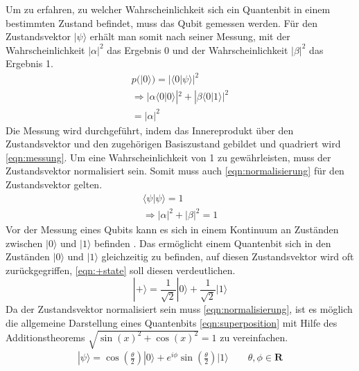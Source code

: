 Um zu erfahren, zu welcher Wahrscheinlichkeit sich ein Quantenbit in einem bestimmten Zustand befindet, muss das Qubit gemessen werden. F\"ur den Zustandsvektor $|\psi\rangle$ erh\"alt man somit nach seiner Messung, mit der Wahrscheinlichkeit $|\alpha|^2$ das Ergebnis 0 und der Wahrscheinlichkeit $|\beta|^2$ das Ergebnis 1.
\begin{equation}\label{eqn:messung}
        \begin{gathered}
                p(|0\rangle) = |\langle 0|\psi \rangle|^2 \\
                \Rightarrow | \alpha \langle 0|0 \rangle|^2 + |\beta \langle 0|1 \rangle |^2 \\
                = | \alpha |^2
        \end{gathered}       
\end{equation}
Die Messung wird durchgef\"uhrt, indem das Innereprodukt \"uber den Zustandsvektor und den zugeh\"origen Basiszustand gebildet und quadriert wird \ref{eqn:messung}. Um eine Wahrscheinlichkeit von 1 zu gew\"ahrleisten, muss der Zustandsvektor normalisiert sein. Somit muss auch \ref{eqn:normalisierung} f\"ur den Zustandsvektor gelten.
\begin{equation}\label{eqn:normalisierung}
\begin{gathered}
         \langle \psi | \psi \rangle = 1 \\
         \Rightarrow |\alpha|^2 +|\beta|^2 = 1
\end{gathered}
\end{equation}
Vor der Messung eines Qubits kann es sich in einem Kontinuum an Zust\"anden zwischen $|0\rangle$ und $|1\rangle$ befinden \cite{nielsen_chuang_2010}. Das erm\"oglicht einem Quantenbit sich in den Zust\"anden $|0\rangle$ und $|1\rangle$ gleichzeitig zu befinden, auf diesen Zustandsvektor wird oft zur\"uckgegriffen, \ref{eqn:+state} soll diesen verdeutlichen.
\begin{equation}\label{eqn:+state}
|+\rangle = \frac{1}{\sqrt{2}}|0\rangle+\frac{1}{\sqrt{2}}|1\rangle
\end{equation}
Da der Zustandsvektor normalisiert sein muss \ref{eqn:normalisierung}, ist es m\"oglich die allgemeine Darstellung eines Quantenbits \ref{eqn:superposition} mit Hilfe des Additionstheorems $\sqrt{\sin(x)^2+\cos(x)^2} = 1$ zu vereinfachen.
\begin{equation}\label{eqn:bloch-kugel}
\begin{gathered}
|\psi\rangle = \cos\left(\frac{\theta}{2}\right)|0\rangle+e^{i\phi}\sin\left(\frac{\theta}{2}\right)|1\rangle \qquad \theta, \phi \in \mathbf{R}
\end{gathered}
\end{equation}
